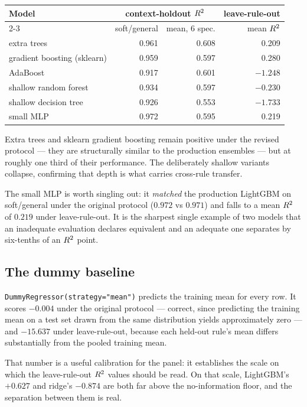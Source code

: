\begin{center}\small
\begin{tabular}{lrrr}
\toprule
Model & \multicolumn{2}{c}{context-holdout $R^2$} & leave-rule-out \\
\cmidrule(lr){2-3}
 & soft/general & mean, 6 spec. & mean $R^2$ \\
\midrule
extra trees & 0.961 & 0.608 & 0.209 \\
gradient boosting (sklearn) & 0.959 & 0.597 & 0.280 \\
AdaBoost & 0.917 & 0.601 & $-1.248$ \\
shallow random forest & 0.934 & 0.597 & $-0.230$ \\
shallow decision tree & 0.926 & 0.553 & $-1.733$ \\
small MLP & 0.972 & 0.595 & 0.219 \\
\bottomrule
\end{tabular}
\end{center}

Extra trees and sklearn gradient boosting remain positive under the
revised protocol --- they are structurally similar to the production
ensembles --- but at roughly one third of their performance. The
deliberately shallow variants collapse, confirming that depth is what
carries cross-rule transfer.

The small MLP is worth singling out: it \emph{matched} the production
LightGBM on soft/general under the original protocol ($0.972$ vs $0.971$)
and falls to a mean $R^2$ of $0.219$ under leave-rule-out. It is the
sharpest single example of two models that an inadequate evaluation
declares equivalent and an adequate one separates by six-tenths of an
$R^2$ point.

\subsection{The dummy baseline}

\texttt{DummyRegressor(strategy="mean")} predicts the training mean for
every row. It scores $-0.004$ under the original protocol --- correct,
since predicting the training mean on a test set drawn from the same
distribution yields approximately zero --- and $-15.637$ under
leave-rule-out, because each held-out rule's mean differs substantially
from the pooled training mean.

That number is a useful calibration for the panel: it establishes the
scale on which the leave-rule-out $R^2$ values should be read. On that
scale, LightGBM's $+0.627$ and ridge's $-0.874$ are both far above the
no-information floor, and the separation between them is real.


